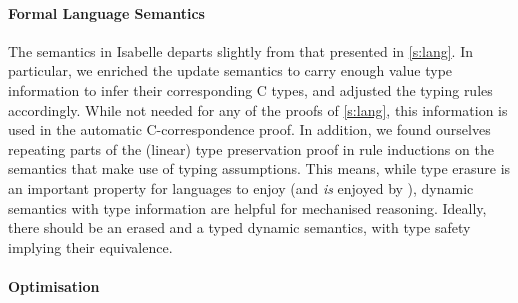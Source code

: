 \documentclass[9pt\ifFinal\else,preprint,nocopyrightspace\fi,\ifAlpha\else natbib,authoryear\fi]{sigplanconf}
\begin{document}
\begin{figure*}[t]
\begin{center}
\begin{inductive0}
\paragraph{Formal Language Semantics}
The \CDSL semantics in Isabelle departs slightly from that presented in
\autoref{s:lang}. In particular, we enriched the update semantics to carry
enough value type information to infer their corresponding C types, and
adjusted the typing rules accordingly. While not needed for any of the
proofs of \autoref{s:lang}, this information is used in the automatic
C-correspondence proof.
In addition, we found ourselves repeating parts of the (linear) type
preservation proof in rule inductions on the semantics that make use of
typing assumptions. This means, while type erasure is an important
property for languages to enjoy (and \emph{is} enjoyed by \CDSL), dynamic
semantics with type information are helpful for mechanised
reasoning. Ideally, there should be an erased and a typed dynamic
semantics, with type safety implying their equivalence.



\paragraph{Optimisation}


\end{inductive0}
\end{center}
\end{figure*}
\end{document}
